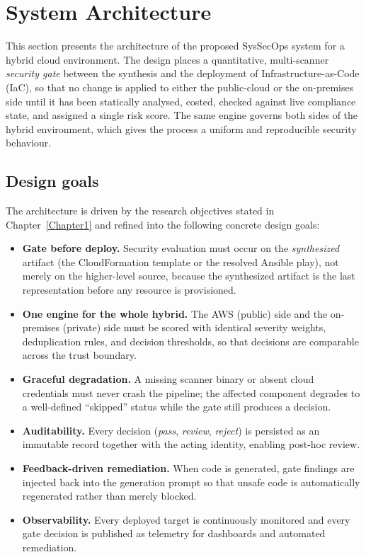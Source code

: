 \section{System Architecture}
\label{sec:architecture}

This section presents the architecture of the proposed SysSecOps system for a hybrid
cloud environment. The design places a quantitative, multi-scanner \emph{security gate}
between the synthesis and the deployment of Infrastructure-as-Code (IaC), so that no
change is applied to either the public-cloud or the on-premises side until it has been
statically analysed, costed, checked against live compliance state, and assigned a
single risk score. The same engine governs both sides of the hybrid environment, which
gives the process a uniform and reproducible security behaviour.

\subsection{Design goals}
\label{subsec:arch-goals}

The architecture is driven by the research objectives stated in Chapter~\ref{Chapter1}
and refined into the following concrete design goals:

\begin{itemize}
    \item \textbf{Gate before deploy.} Security evaluation must occur on the
    \emph{synthesized} artifact (the CloudFormation template or the resolved Ansible
    play), not merely on the higher-level source, because the synthesized artifact is
    the last representation before any resource is provisioned.
    \item \textbf{One engine for the whole hybrid.} The AWS (public) side and the
    on-premises (private) side must be scored with identical severity weights,
    deduplication rules, and decision thresholds, so that decisions are comparable
    across the trust boundary.
    \item \textbf{Graceful degradation.} A missing scanner binary or absent cloud
    credentials must never crash the pipeline; the affected component degrades to a
    well-defined ``skipped'' status while the gate still produces a decision.
    \item \textbf{Auditability.} Every decision (\emph{pass}, \emph{review},
    \emph{reject}) is persisted as an immutable record together with the acting
    identity, enabling post-hoc review.
    \item \textbf{Feedback-driven remediation.} When code is generated, gate findings
    are injected back into the generation prompt so that unsafe code is automatically
    regenerated rather than merely blocked.
    \item \textbf{Observability.} Every deployed target is continuously monitored and
    every gate decision is published as telemetry for dashboards and automated
    remediation.
\end{itemize}

